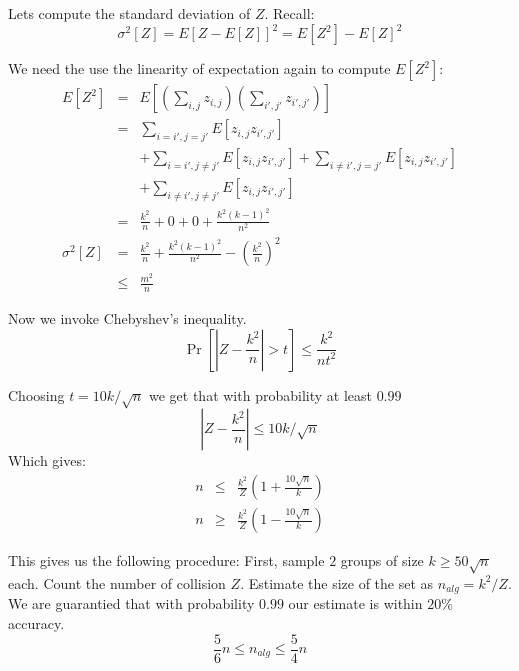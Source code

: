 \documentclass{article}
\begin{document}
\noindent Lets compute the standard deviation of $Z$. Recall:
$$\sigma^2[Z]  = E[Z-E[Z]]^2= E[Z^2] - E[Z]^2$$

\noindent  We need the use the linearity of expectation again to compute $E[Z^2]$:
\begin{eqnarray}
E[Z^2] &=& E[(\sum_{i,j} z_{i,j})(\sum_{i',j'} z_{i',j'})] \\ 
&=& \sum_{i=i',j=j'} E[z_{i,j}z_{i',j'}] \\
& & + \sum_{i=i', j \ne j'} E[z_{i,j}z_{i',j'}] +\sum_{i \ne i', j = j'} E[z_{i,j}z_{i',j'}]  \\
& & + \sum_{i \ne i', j \ne j'} E[z_{i,j}z_{i',j'}] \\
& = & \frac{k^2}{n} + 0 + 0 + \frac{k^2(k-1)^2}{n^2} \\
\sigma^2[Z] &=& \frac{k^2}{n} + \frac{k^2(k-1)^2}{n^2} - \left(\frac{k^2}{n}\right)^2 \\
&\le& \frac{m^2}{n}  
\end{eqnarray}

\noindent  Now we invoke Chebyshev's inequality.
\begin{equation}
\Pr[|Z - \frac{k^2}{n}| > t] \le \frac{k^2}{nt^2}
\end{equation}

\noindent Choosing $t = 10k/\sqrt{n}$ we get that with probability at least $0.99$
\begin{equation}
|Z - \frac{k^2}{n}| \le 10k/\sqrt{n}
\end{equation}
Which gives:
\begin{eqnarray}
n &\le& \frac{k^2}{Z}(1+\frac{10\sqrt{n}}{k}) \\
n &\ge& \frac{k^2}{Z}(1-\frac{10\sqrt{n}}{k})
\end{eqnarray}


\noindent This gives us the following procedure:
First, sample $2$ groups of size $k \ge 50\sqrt{n}$ each.
Count the number of collision $Z$.
Estimate the size of the set as $n_{alg} = k^2/Z$.
We are guarantied that with probability $0.99$ our estimate is within $20\%$ accuracy.
\begin{equation}
\frac{5}{6}n \le n_{alg} \le \frac{5}{4}n
\end{equation}
\end{document}
